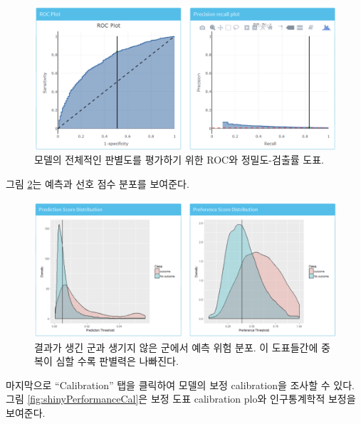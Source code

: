 \documentclass[10.5pt]{book}
\theoremstyle{definition}
\theoremstyle{definition}
\theoremstyle{definition}
\theoremstyle{remark}
\begin{document}
\begin{figure}

{\centering \includegraphics[width=1\linewidth]{images/PatientLevelPrediction/shiny/shinyPerformanceDisc} 

}

\caption{모델의 전체적인 판별도를 평가하기 위한 ROC와 정밀도-검출률 도표.}\label{fig:shinyPerformanceDisc}
\end{figure}

그림 \ref{fig:shinyPerformanceDist}는 예측과 선호 점수 분포를 보여준다.

\begin{figure}

{\centering \includegraphics[width=1\linewidth]{images/PatientLevelPrediction/shiny/shinyPerformanceDist} 

}

\caption{결과가 생긴 군과 생기지 않은 군에서 예측 위험 분포. 이 도표들간에 중복이 심할 수록 판별력은 나빠진다.}\label{fig:shinyPerformanceDist}
\end{figure}

마지막으로 ``Calibration'' 탭을 클릭하여 모델의 보정 calibration을
조사할 수 있다. 그림 \ref{fig:shinyPerformanceCal}은 보정 도표
calibration plo와 인구통계학적 보정을 보여준다.
\end{document}
